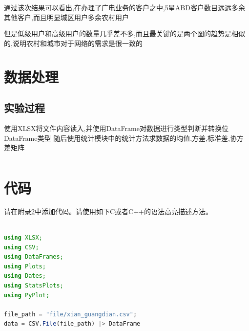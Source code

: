 \documentclass[a4paper]{article}
\begin{document}
通过该次结果可以看出,在办理了广电业务的客户之中,5星ABD客户数目远远多余其他客户,而且明显城区用户多余农村用户

但是低级用户和高级用户的数量几乎差不多,而且最关键的是两个图的趋势是相似的,说明农村和城市对于网络的需求是很一致的

\newpage

\section{数据处理}\label{sub:process}
\subsection{实验过程} \label{sub:process-lab}

使用XLSX将文件内容读入,并使用DataFrame对数据进行类型判断并转换位DataFrame类型
随后使用统计模块中的统计方法求数据的均值,方差,标准差,协方差矩阵

\begin{lstlisting}[language=julia]
\end{lstlisting}


\appendix
\section{代码}\label{sub:app.code}
请在附录\ref{sub:app.code}中添加代码。请使用如下C或者C++的语法高亮描述方法。
\begin{lstlisting}[language=julia]

using XLSX;
using CSV;
using DataFrames;
using Plots;
using Dates;
using StatsPlots;
using PyPlot;

file_path = "file/xian_guangdian.csv";
data = CSV.File(file_path) |> DataFrame

\end{lstlisting}
\end{document}
